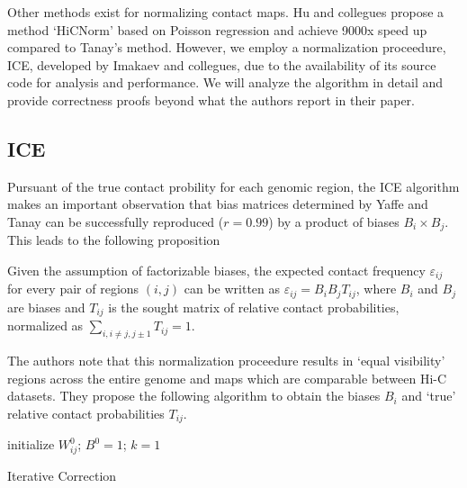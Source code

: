 Other methods exist for normalizing contact maps.  Hu and collegues propose a method `HiCNorm' based on Poisson regression and achieve
9000x speed up compared to Tanay's method\cite{hu2012}.  However, we employ a normalization proceedure, \gls{ICE}, developed by Imakaev
and collegues, due to the availability of its source code for analysis and performance\cite{imakaev2012}.   We will analyze the
algorithm in detail and provide correctness proofs beyond what the authors report in their paper\cite{imakaev2012}.

\subsection*{\gls{ICE}}

Pursuant of the true contact probility for each genomic region, the \gls{ICE} algorithm makes an important observation that bias matrices
determined by Yaffe and Tanay\cite{yaffe2011} can be successfully reproduced ($r = 0.99$) by a product of biases $B_i \times B_j$.  This
leads to the following proposition

\begin{prop}
  Given the assumption of factorizable biases, the expected contact frequency $\varepsilon_{ij}$ for every pair of regions $(i,j)$ can
  be written as $\varepsilon_{ij} = B_{i}B_{j}T_{ij}$, where $B_i$ and $B_j$ are biases and $T_{ij}$ is the sought matrix of relative contact
  probabilities, normalized as $\sum_{i, i \neq j, j \pm 1}T_{ij} = 1$.
\end{prop}

The authors note that this normalization proceedure results in `equal visibility' regions across the entire genome and maps which are
comparable between Hi-C datasets.  They propose the following algorithm to obtain the biases $B_i$ and `true' relative contact probabilities
$T_{ij}$.

\begin{algorithm}[H]
  initialize $W^{0}_{ij}$; $B^0 = 1$; $k = 1$\;
  \caption{Iterative Correction}
\end{algorithm}

